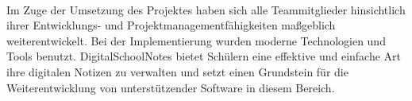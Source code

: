 \\
Im Zuge der Umsetzung des Projektes haben sich alle Teammitglieder hinsichtlich ihrer Entwicklungs- und Projektmanagementfähigkeiten maßgeblich weiterentwickelt. Bei der Implementierung wurden moderne Technologien und Tools benutzt. DigitalSchoolNotes bietet Schülern eine effektive und einfache Art ihre digitalen Notizen zu verwalten und setzt einen Grundstein für die Weiterentwicklung von unterstützender Software in diesem Bereich.